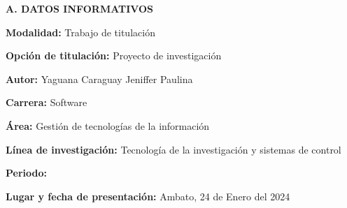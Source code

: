 


\setcounter{page}{2}

\tableofcontents
\pagebreak
\listoffigures
\pagebreak
\listoftables


\pagebreak
\begin{center}
	\textbf{A. DATOS INFORMATIVOS}
\end{center}\par
\textbf{Modalidad: }Trabajo de titulación\par
\textbf{Opción de titulación: }Proyecto de investigación\par
\textbf{Autor: }Yaguana Caraguay Jeniffer Paulina\par
\textbf{Carrera: }Software\par
\textbf{Área: }Gestión de tecnologías de la información\par
\textbf{Línea de investigación: }Tecnología de la investigación y sistemas de control\par
\textbf{Periodo: } \periodo\par
\textbf{Lugar y fecha de presentación: }Ambato, 24 de Enero del 2024
\pagebreak
